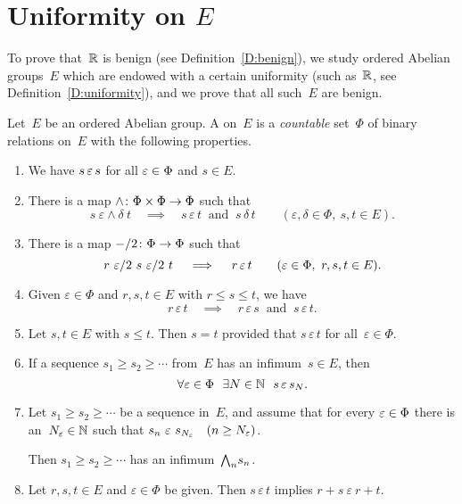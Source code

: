 \documentclass[main.tex]{subfiles}
\begin{document}
\section{Uniformity on $E$}
To prove that~$\mathbb{R}$
is benign (see Definition~\ref{D:benign}),
we study
ordered Abelian groups~$E$ which are endowed with
a certain uniformity (such as~$\mathbb{R}$, see Definition~\ref{D:uniformity}),
and we prove that all such~$E$ are benign.
%
%
\begin{dfn}
\label{D:uniformity}
Let~$E$ be an ordered Abelian group.
A  on~$E$
is a \emph{countable} set~$\Phi$ of binary relations on~$E$
with the following properties.
\begin{enumerate}
\item 
\label{E-refl}
We have $s \,\varepsilon\, s$ for all $\varepsilon \in \Phi$ and $s \in E$.
\item
There is a map $\wedge\colon \Phi\times\Phi \rightarrow \Phi$
such that
\begin{equation*}
s \ \varepsilon\wedge\delta\  t
\quad\implies\quad
s \,\varepsilon\,t\ \text{ and }\ s\,\delta\,t
\qquad (\varepsilon,\delta\in\Phi,\ s,t\in E).
\end{equation*}

\item
There is a map $-/2\colon \Phi \rightarrow \Phi$
such that
\begin{equation*}
r\ \varepsilon/2 \ s \ \varepsilon/2 \ t
\quad\implies\quad
r \,\varepsilon\, t\qquad(\varepsilon\in\Phi,\ r,s,t\in E).
\end{equation*}

\item \label{E-ord}
Given $\varepsilon\in\Phi$ and $r,s,t\in E$ 
with $r\leq s\leq t$,
we have
\begin{equation*}
r\,\varepsilon\,t
\quad\implies\quad
r\,\varepsilon\,s
\ \text{ and }\ 
s\,\varepsilon\,t.
\end{equation*}

\item \label{E-haus}
Let $s,t\in E$ with $s\leq t$.
Then $s=t$ provided that $s\,\varepsilon\,t$ for all~$\varepsilon\in\Phi$.

\item \label{E-inf-conv}
If a sequence $s_1 \geq s_2 \geq \dotsb$ from~$E$
has an infimum~$s\in E$,
then 
\begin{equation*}
\forall\varepsilon\in \Phi
\ \ \exists N\in \mathbb{N}
\ \ s \, \varepsilon\, s_N.
\end{equation*}

\item  \label{E-bound-inf}
Let $s_1\geq s_2 \geq \dotsb$ be a
sequence in~$E$,
and assume that
for every $\varepsilon\in \Phi$
there is an~$N_\varepsilon \in \mathbb{N}$ such that 
$s_{n} \ \varepsilon \ s_{N_\varepsilon}\quad (n\geq N_\varepsilon)$.

Then $s_1 \geq s_2 \geq \dotsb$ has an infimum~$\textstyle{\bigwedge}_n s_n$.

\item \label{E-add}
Let $r,s,t\in E$ and $\varepsilon\in\Phi$ be given.
Then $s\,\varepsilon\,t$ implies $r+s\ \varepsilon\ r+t$.
\setcounter{epropc}{\value{enumi}}
\end{enumerate}
\end{dfn}
\end{document}
